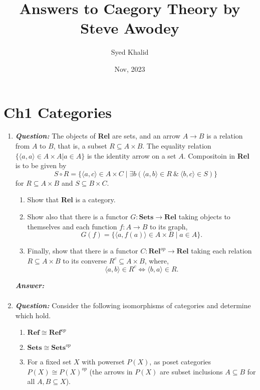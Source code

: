 \documentclass{article}
\begin{document}
\title{Answers to Caegory Theory by Steve Awodey}
\author{Syed Khalid}
\date{Nov, 2023}
\maketitle

\section{Ch1 Categories}

\begin{enumerate}
	\item
	      \textbf{\textit{Question:}} The objects of \textbf{Rel} are sets, and an arrow $ A \to B $ is a relation from $A$ to $B$, that is, a subset $R \subseteq A \times B$. The equality relation $\{\langle a,a \rangle \in A \times A | a \in A\}$ is the identity arrow on a set $A$. Compositoin in \textbf{Rel} is to be given by
	      \[
		      S \circ R = \{ \langle a, c \rangle \in A \times C \mid \exists b ( \langle a,b \rangle \in R \ \& \ \langle b,c \rangle \in S) \}
	      \]
	      for $R \subseteq A \times B$ and $S \subseteq B \times C$.
	      \begin{enumerate}
		      \item  Show that \textbf{Rel} is a category.
		      \item     Show also that there is a functor $G : \textbf{Sets} \to \textbf{Rel}$ taking objects to themselves and each function $f : A \to B$ to its graph,
		            \[
			            G(f) = \{ \langle a, f(a) \rangle \in A \times B \mid a \in A \}.
		            \]
		      \item  Finally, show that there is a functor $C : \textbf{Rel}^{op} \to \textbf{Rel}$ taking each relation $R \subseteq A \times B$ to its converse $R^c \subseteq A \times B$, where, \[
			            \langle a,b \rangle \in R^c \Leftrightarrow \langle b,a \rangle \in R.
		            \]
	      \end{enumerate}


	      \textbf{\textit{Answer:}}
	      \begin{align*}
	      \end{align*}

	\item
	      \textbf{\textit{Question:}} Consider the following isomorphisms of categories and determine which hold.
	      \begin{enumerate}
		      \item  $\textbf{Ref} \cong \textbf{Ref}^{op}$
		      \item  $\textbf{Sets} \cong \textbf{Sets}^{op}$
		      \item  For a fixed set $X$ with powerset $P(X)$, as poset categories $P(X) \cong P(X)^{op}$ (the arrows in $P(X)$ are subset inclusions $ A \subseteq B$ for all $A,B \subseteq X$).
	      \end{enumerate}



\end{enumerate}
\end{document}
